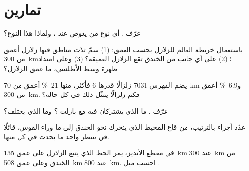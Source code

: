 \section{تمارين}

\begin{exercise}[$\star$]\label{exo:g11:subduction-zones:1}
عرّف  . أي نوع من  يغوص عند
، ولماذا هذا النوع؟
\end{exercise}

\begin{exercise}[$\star$]\label{exo:g11:subduction-zones:2}
باستعمال خريطة العالم للزلازل بحسب العمق: (1) سمّ ثلاث مناطق فيها
زلازل أعمق من \qty{300}{km}؛ (2) على أي جانب من الخندق تقع
الزلازل العميقة؟ (3) وعلى امتداد ظهرة وسط الأطلسي، ما عمق
الزلازل؟
\end{exercise}

\begin{exercise}[$\star$]\label{exo:g11:subduction-zones:3}
يضم الفهرس \num{7031} زلزالًا قدرها 6 فأكثر، منها
\qty{21}{\percent} أعمق من \qty{70}{km} و\qty{6.9}{\percent} أعمق
من \qty{300}{km}. فكم زلزالًا يمثّل ذلك في كل حالة؟
\end{exercise}

\begin{exercise}[$\star$]\label{exo:g11:subduction-zones:4}
عرّف  . ما الذي يشتركان فيه مع بازلت
؟ وما الذي يختلف؟
\end{exercise}

\begin{exercise}[$\star$]\label{exo:g11:subduction-zones:5}
عدّد أجزاء  بالترتيب، من قاع المحيط الذي
يتحرك نحو الخندق إلى ما وراء القوس، قائلًا في سطر واحد ما يحدث في
كل منها.
\end{exercise}

\begin{exercise}[$\star\star$]\label{exo:g11:subduction-zones:6}
في مقطع الأنديز، يمر الخط الذي يتبع الزلازل على عمق
\qty{135}{km} عند \qty{300}{km} من الخندق وعلى عمق \qty{508}{km} عند
\qty{800}{km}. احسب ميل .
\end{exercise}

